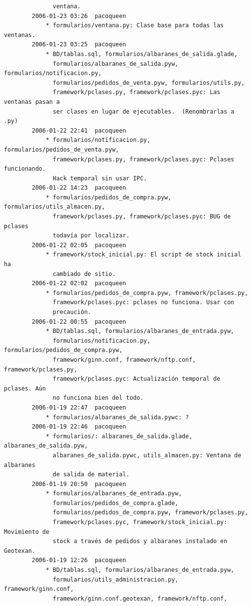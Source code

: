 \documentclass[a4paper]{article}
\begin{document}
\begin{verbatim}
              ventana.
        2006-01-23 03:26  pacoqueen
            * formularios/ventana.py: Clase base para todas las ventanas.
        2006-01-23 03:25  pacoqueen
            * BD/tablas.sql, formularios/albaranes_de_salida.glade,
              formularios/albaranes_de_salida.pyw, formularios/notificacion.py,
              formularios/pedidos_de_venta.pyw, formularios/utils.py,
              framework/pclases.py, framework/pclases.pyc: Las ventanas pasan a
              ser clases en lugar de ejecutables.  (Renombrarlas a .py)
        2006-01-22 22:41  pacoqueen
            * formularios/notificacion.py, formularios/pedidos_de_venta.pyw,
              framework/pclases.py, framework/pclases.pyc: Pclases funcionando.
              Hack temporal sin usar IPC.
        2006-01-22 14:23  pacoqueen
            * formularios/pedidos_de_compra.pyw, formularios/utils_almacen.py,
              framework/pclases.py, framework/pclases.pyc: BUG de pclases
              todavía por localizar.
        2006-01-22 02:05  pacoqueen
            * framework/stock_inicial.py: El script de stock inicial ha
              cambiado de sitio.
        2006-01-22 02:02  pacoqueen
            * formularios/pedidos_de_compra.pyw, framework/pclases.py,
              framework/pclases.pyc: pclases no funciona. Usar con
              precaución.
        2006-01-22 00:55  pacoqueen
            * BD/tablas.sql, formularios/albaranes_de_entrada.pyw,
              formularios/notificacion.py, formularios/pedidos_de_compra.pyw,
              framework/ginn.conf, framework/nftp.conf, framework/pclases.py,
              framework/pclases.pyc: Actualización temporal de pclases. Aún
              no funciona bien del todo.
        2006-01-19 22:47  pacoqueen
            * formularios/albaranes_de_salida.pywc: ?
        2006-01-19 22:46  pacoqueen
            * formularios/: albaranes_de_salida.glade, albaranes_de_salida.pyw,
              albaranes_de_salida.pywc, utils_almacen.py: Ventana de albaranes
              de salida de material.
        2006-01-19 20:50  pacoqueen
            * formularios/albaranes_de_entrada.pyw,
              formularios/pedidos_de_compra.glade,
              formularios/pedidos_de_compra.pyw, framework/pclases.py,
              framework/pclases.pyc, framework/stock_inicial.py: Movimiento de
              stock a través de pedidos y albaranes instalado en Geotexan.
        2006-01-19 12:26  pacoqueen
            * BD/tablas.sql, formularios/albaranes_de_entrada.pyw,
              formularios/utils_administracion.py, framework/ginn.conf,
              framework/ginn.conf.geotexan, framework/nftp.conf,

\end{verbatim}
\end{document}
